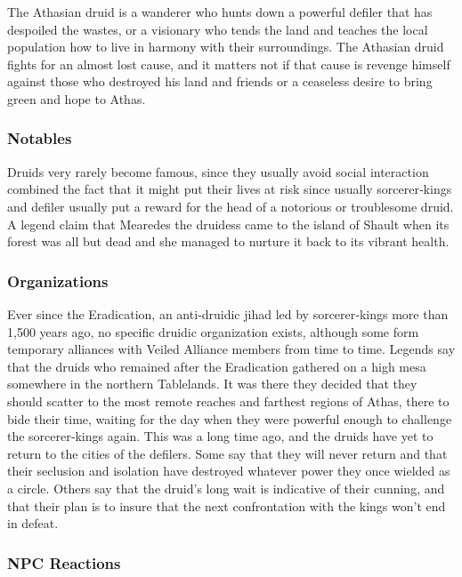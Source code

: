 The Athasian druid is a wanderer who hunts down a powerful defiler that has despoiled the wastes, or a visionary who tends the land and teaches the local population how to live in harmony with their surroundings. The Athasian druid fights for an almost lost cause, and it matters not if that cause is revenge himself against those who destroyed his land and friends or a ceaseless desire to bring green and hope to Athas.

\subsubsection{Notables}

Druids very rarely become famous, since they usually avoid social interaction combined the fact that it might put their lives at risk since usually sorcerer‐kings and defiler usually put a reward for the head of a notorious or troublesome druid. A legend claim that Mearedes the druidess came to the island of Shault when its forest was all but dead and she managed to nurture it back to its vibrant health.

\subsubsection{Organizations}

Ever since the Eradication, an anti‐druidic jihad led by sorcerer‐kings more than 1,500 years ago, no specific druidic organization exists, although some form temporary alliances with Veiled Alliance members from time to time. Legends say that the druids who remained after the Eradication gathered on a high mesa somewhere in the northern Tablelands. It was there they decided that they should scatter to the most remote reaches and farthest regions of Athas, there to bide their time, waiting for the day when they were powerful enough to challenge the sorcerer‐kings again. This was a long time ago, and the druids have yet to return to the cities of the defilers. Some say that they will never return and that their seclusion and isolation have destroyed whatever power they once wielded as a circle. Others say that the druid's long wait is indicative of their cunning, and that their plan is to insure that the next confrontation with the kings won't end in defeat.

\subsubsection{NPC Reactions}

